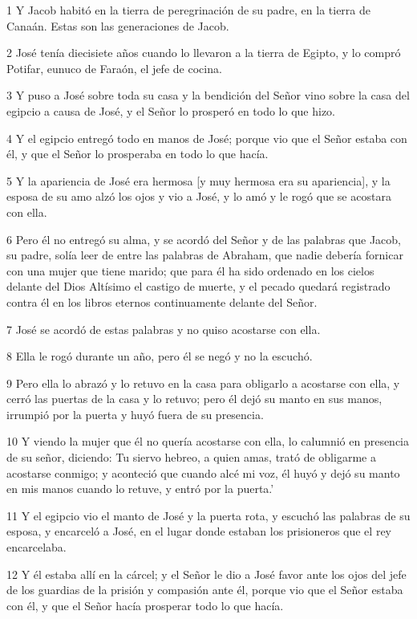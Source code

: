 \par 1 Y Jacob habitó en la tierra de peregrinación de su padre, en la tierra de Canaán. Estas son las generaciones de Jacob.
\par 2 José tenía diecisiete años cuando lo llevaron a la tierra de Egipto, y lo compró Potifar, eunuco de Faraón, el jefe de cocina.
\par 3 Y puso a José sobre toda su casa y la bendición del Señor vino sobre la casa del egipcio a causa de José, y el Señor lo prosperó en todo lo que hizo.
\par 4 Y el egipcio entregó todo en manos de José; porque vio que el Señor estaba con él, y que el Señor lo prosperaba en todo lo que hacía.
\par 5 Y la apariencia de José era hermosa [y muy hermosa era su apariencia], y la esposa de su amo alzó los ojos y vio a José, y lo amó y le rogó que se acostara con ella.
\par 6 Pero él no entregó su alma, y ​​se acordó del Señor y de las palabras que Jacob, su padre, solía leer de entre las palabras de Abraham, que nadie debería fornicar con una mujer que tiene marido; que para él ha sido ordenado en los cielos delante del Dios Altísimo el castigo de muerte, y el pecado quedará registrado contra él en los libros eternos continuamente delante del Señor.
\par 7 José se acordó de estas palabras y no quiso acostarse con ella.
\par 8 Ella le rogó durante un año, pero él se negó y no la escuchó.
\par 9 Pero ella lo abrazó y lo retuvo en la casa para obligarlo a acostarse con ella, y cerró las puertas de la casa y lo retuvo; pero él dejó su manto en sus manos, irrumpió por la puerta y huyó fuera de su presencia.
\par 10 Y viendo la mujer que él no quería acostarse con ella, lo calumnió en presencia de su señor, diciendo: Tu siervo hebreo, a quien amas, trató de obligarme a acostarse conmigo; y aconteció que cuando alcé mi voz, él huyó y dejó su manto en mis manos cuando lo retuve, y entró por la puerta.'
\par 11 Y el egipcio vio el manto de José y la puerta rota, y escuchó las palabras de su esposa, y encarceló a José, en el lugar donde estaban los prisioneros que el rey encarcelaba.
\par 12 Y él estaba allí en la cárcel; y el Señor le dio a José favor ante los ojos del jefe de los guardias de la prisión y compasión ante él, porque vio que el Señor estaba con él, y que el Señor hacía prosperar todo lo que hacía.
